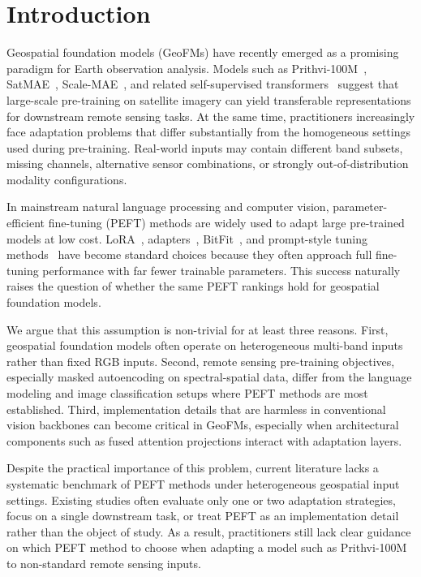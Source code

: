 \section{Introduction}

Geospatial foundation models (GeoFMs) have recently emerged as a promising paradigm for Earth observation analysis. Models such as Prithvi-100M~\cite{jakubik2023prithvi}, SatMAE~\cite{cong2022satmae}, Scale-MAE~\cite{reed2023scalemae}, and related self-supervised transformers~\cite{hong2024spectralgpt} suggest that large-scale pre-training on satellite imagery can yield transferable representations for downstream remote sensing tasks. At the same time, practitioners increasingly face adaptation problems that differ substantially from the homogeneous settings used during pre-training. Real-world inputs may contain different band subsets, missing channels, alternative sensor combinations, or strongly out-of-distribution modality configurations.

In mainstream natural language processing and computer vision, parameter-efficient fine-tuning (PEFT) methods are widely used to adapt large pre-trained models at low cost. LoRA~\cite{hu2022lora}, adapters~\cite{houlsby2019adapter}, BitFit~\cite{zaken2022bitfit}, and prompt-style tuning methods~\cite{lester2021prompt,jia2022vpt} have become standard choices because they often approach full fine-tuning performance with far fewer trainable parameters. This success naturally raises the question of whether the same PEFT rankings hold for geospatial foundation models.

We argue that this assumption is non-trivial for at least three reasons. First, geospatial foundation models often operate on heterogeneous multi-band inputs rather than fixed RGB inputs. Second, remote sensing pre-training objectives, especially masked autoencoding on spectral-spatial data, differ from the language modeling and image classification setups where PEFT methods are most established. Third, implementation details that are harmless in conventional vision backbones can become critical in GeoFMs, especially when architectural components such as fused attention projections interact with adaptation layers.

Despite the practical importance of this problem, current literature lacks a systematic benchmark of PEFT methods under heterogeneous geospatial input settings. Existing studies often evaluate only one or two adaptation strategies, focus on a single downstream task, or treat PEFT as an implementation detail rather than the object of study. As a result, practitioners still lack clear guidance on which PEFT method to choose when adapting a model such as Prithvi-100M to non-standard remote sensing inputs.

